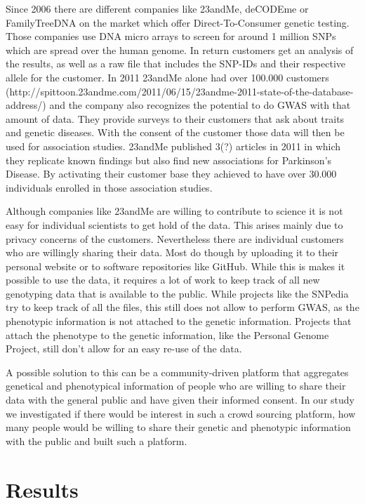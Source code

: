 \documentclass[10pt]{article}
\begin{document}
Since 2006 there are different companies like 23andMe, deCODEme or FamilyTreeDNA on the market which offer Direct-To-Consumer genetic testing. Those companies use DNA micro arrays to screen for around 1 million SNPs which are spread over the human genome. In return customers get an analysis of the results, as well as a raw file that includes the SNP-IDs and their respective allele for the customer. In 2011 23andMe alone had over 100.000 customers (http://spittoon.23andme.com/2011/06/15/23andme-2011-state-of-the-database-address/) and the company also recognizes the potential to do GWAS with that amount of data. They provide surveys to their customers that ask about traits and genetic diseases. With the consent of the customer those data will then be used for association studies. 23andMe published 3(?) articles in 2011 in which they replicate known findings but also find new associations for Parkinson's Disease. By activating their customer base they achieved to have over 30.000 individuals enrolled in those association studies.  

Although companies like 23andMe are willing to contribute to science it is not easy for individual scientists to get hold of the data. This arises mainly due to privacy concerns of the customers. Nevertheless there are individual customers who are willingly sharing their data. Most do though by uploading it to their personal website or to software repositories like GitHub. While this is makes it possible to use the data, it requires a lot of work to keep track of all new genotyping data that is available to the public. While projects like the SNPedia try to keep track of all the files, this still does not allow to perform GWAS, as the phenotypic information is not attached to the genetic information. Projects that attach the phenotype to the genetic information, like the Personal Genome Project, still don't allow for an easy re-use of the data.  

A possible solution to this can be a community-driven platform that aggregates genetical and phenotypical information of people who are willing to share their data with the general public and have given their informed consent. In our study we investigated if there would be interest in such a crowd sourcing platform, how many people would be willing to share their genetic and phenotypic information with the public and built such a platform. 

\section*{Results}
\end{document}
